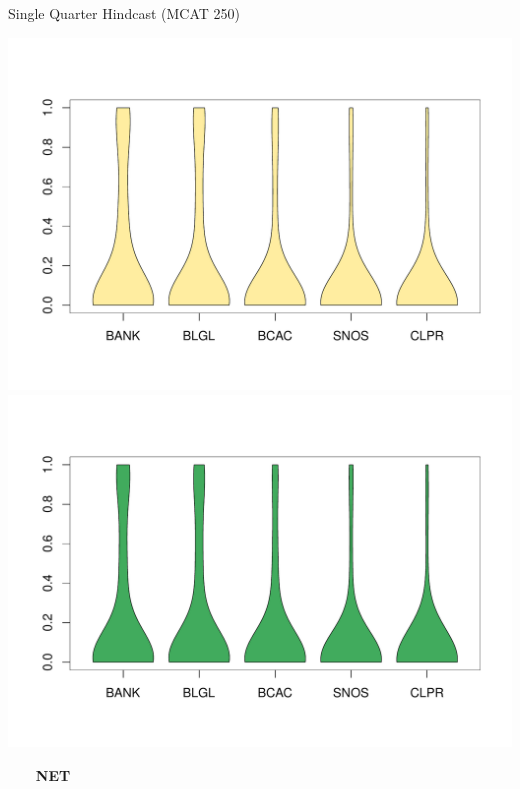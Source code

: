 \documentclass[ xcolor = pdftex, dvipsnames, table ]{beamer}
\begin{document}
\begin{frame}{Single Quarter Hindcast (MCAT 250)}
\begin{minipage}{0.29\textwidth}
\includegraphics[height=0.36\textheight]{../pictures/vioOLAHKL.pdf}\\
\vspace*{-1.3cm}
\includegraphics[height=0.36\textheight]{../pictures/vioOSDHKL.pdf}
\end{minipage}
\hspace*{0.5cm}
\begin{minipage}{0.29\textwidth}
\begin{center}
$~~~~~~~~~$\textbf{NET}
\end{center}
\vspace*{-0.75cm}

\end{minipage}
\end{frame}
\end{document}
